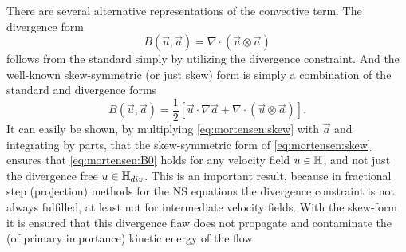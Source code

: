 There are several alternative representations of the convective
term. The divergence form
\begin{equation}
B(\vec{u},\vec{a})=\nabla \cdot (\vec{u} \otimes \vec{a})
\end{equation}
follows from the standard simply by utilizing the divergence constraint. And the well-known skew-symmetric (or just skew) form is simply a combination of the standard and divergence forms
\begin{equation}
 B(\vec{u},\vec{a}) = \frac{1}{2}\left[ \vec{u}\cdot \nabla \vec{a} + \nabla \cdot (\vec{u} \otimes \vec{a}) \right].
\label{eq:mortensen:skew}
\end{equation}
It can easily be shown, by multiplying \eqref{eq:mortensen:skew}
with $\vec{a}$ and integrating by parts, that the skew-symmetric form
of \eqref{eq:mortensen:skew} ensures that \eqref{eq:mortensen:B0}
holds for any velocity field ${ u } \in \mathbb{H}$, and not just the
divergence free ${ u } \in \mathbb{H}_{div}$. This is an important
result, because in fractional step (projection) methods for the NS
equations the divergence constraint is not always fulfilled, at least
not for intermediate velocity fields. With the skew-form it is ensured
that this divergence flaw does not propagate and contaminate the (of
primary importance) kinetic energy of the flow.



